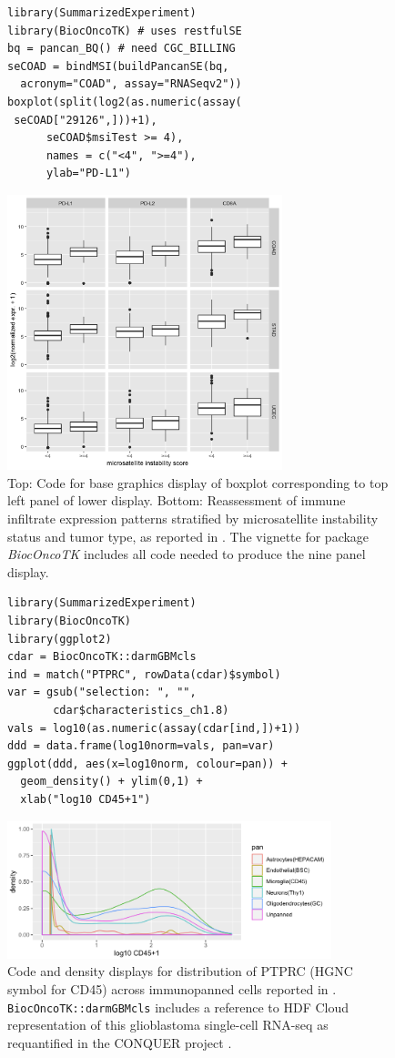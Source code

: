 \documentclass[applications]{gen-bioinformatics}
\newcommand{\Biocpackage}[1]{{\textit{#1}}}
\begin{document}
\begin{figure}[bb]
\begin{verbatim}
library(SummarizedExperiment)
library(BiocOncoTK) # uses restfulSE
bq = pancan_BQ() # need CGC_BILLING
seCOAD = bindMSI(buildPancanSE(bq, 
  acronym="COAD", assay="RNASeqv2"))
boxplot(split(log2(as.numeric(assay(
 seCOAD["29126",]))+1), 
      seCOAD$msiTest >= 4),
      names = c("<4", ">=4"), 
      ylab="PD-L1")
\end{verbatim}
\includegraphics[height=8.0cm]{microsatpan2.png}
\caption{Top: Code for base graphics display of boxplot
corresponding to top left panel of lower display.
Bottom: Reassessment of immune infiltrate expression
patterns stratified by microsatellite instability
status and tumor type, as reported in \cite{Bailey2018}.
The vignette for package \Biocpackage{BiocOncoTK} \citep{bionc} includes all
code needed to produce the nine panel display.}
\label{pancanPanel}
\end{figure}



\begin{figure}[bb]
\begin{verbatim}
library(SummarizedExperiment)
library(BiocOncoTK)
library(ggplot2)
cdar = BiocOncoTK::darmGBMcls
ind = match("PTPRC", rowData(cdar)$symbol)
var = gsub("selection: ", "", 
       cdar$characteristics_ch1.8)
vals = log10(as.numeric(assay(cdar[ind,])+1))
ddd = data.frame(log10norm=vals, pan=var)
ggplot(ddd, aes(x=log10norm, colour=pan)) + 
  geom_density() + ylim(0,1) + 
  xlab("log10 CD45+1")
\end{verbatim}
\includegraphics[height=4.0cm]{darmDens.png}
\caption{Code and density displays for
distribution of PTPRC (HGNC symbol for CD45) across immunopanned
cells reported in \cite{Darmanis2017}.
\texttt{BiocOncoTK::darmGBMcls} includes
a reference to HDF Cloud representation of
this glioblastoma single-cell RNA-seq
as requantified in the CONQUER project \citep{Soneson2018}.}
\label{hdffig}
\end{figure}
\end{document}
